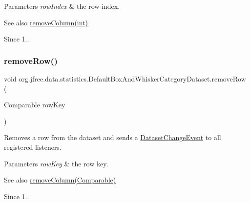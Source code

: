 \begin{DoxyParams}{Parameters}
{\em row\+Index} & the row index.\\
\hline
\end{DoxyParams}
\begin{DoxySeeAlso}{See also}
\mbox{\hyperlink{classorg_1_1jfree_1_1data_1_1statistics_1_1_default_box_and_whisker_category_dataset_a56079e33cbaf78aa51c310f59c54ed74}{remove\+Column(int)}}
\end{DoxySeeAlso}
\begin{DoxySince}{Since}
1.. 
\end{DoxySince}
\mbox{\label{classorg_1_1jfree_1_1data_1_1statistics_1_1_default_box_and_whisker_category_dataset_a574143d92c8a301f0f1d8c13522a0295}} 
\subsubsection{\texorpdfstring{remove\+Row()}{removeRow()}\hspace{0.1cm}{\footnotesize\ttfamily [2/2]}}
{\footnotesize\ttfamily void org.\+jfree.\+data.\+statistics.\+Default\+Box\+And\+Whisker\+Category\+Dataset.\+remove\+Row (\begin{DoxyParamCaption}\item[{Comparable}]{row\+Key }\end{DoxyParamCaption})}

Removes a row from the dataset and sends a \mbox{\hyperlink{}{Dataset\+Change\+Event}} to all registered listeners.


\begin{DoxyParams}{Parameters}
{\em row\+Key} & the row key.\\
\hline
\end{DoxyParams}
\begin{DoxySeeAlso}{See also}
\mbox{\hyperlink{classorg_1_1jfree_1_1data_1_1statistics_1_1_default_box_and_whisker_category_dataset_a05f866339c950f6f63894e1c04f7badd}{remove\+Column(\+Comparable)}}
\end{DoxySeeAlso}
\begin{DoxySince}{Since}
1.. 
\end{DoxySince}


